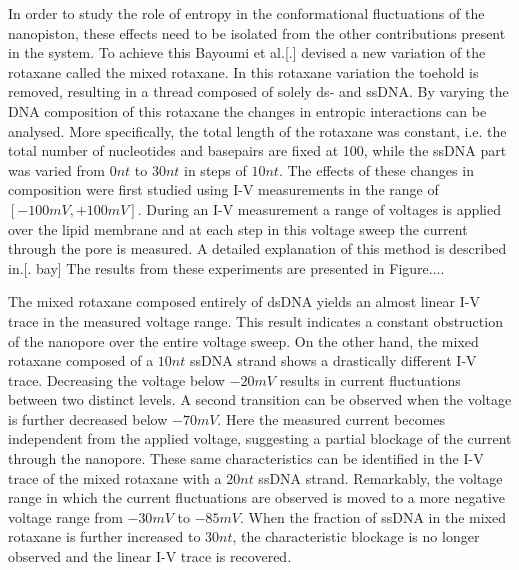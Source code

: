
In order to study the role of entropy in the conformational fluctuations of
the nanopiston, these effects need to be isolated from the other contributions present in
the system. To achieve this Bayoumi et al.[.] devised a new variation of the rotaxane
called the mixed rotaxane. In this rotaxane variation the toehold is removed, resulting
in a thread composed of solely ds- and ssDNA. By varying the DNA composition of this
rotaxane the changes in entropic interactions can be analysed. More specifically, the
total length of the rotaxane was constant, i.e. the total number of nucleotides and
basepairs are fixed at 100, while the ssDNA part was varied from $0nt$ to $30 nt$ in
steps of $10nt$. The effects of these changes in composition were first studied using I-V
measurements in the range of $[-100mV, +100mV]$. During an I-V measurement a range of
voltages is applied over the lipid membrane and at each step in this voltage sweep the
current through the pore is measured. A detailed explanation of this method is described
in.[. bay] The results from these experiments are presented in Figure....

The mixed rotaxane composed entirely of dsDNA yields an almost linear I-V trace in the
measured voltage range. This result indicates a constant obstruction of the nanopore over
the entire voltage sweep. On the other hand, the mixed rotaxane composed of a $10nt$
ssDNA strand shows a drastically different I-V trace. Decreasing the voltage below
$-20mV$ results in current fluctuations between two distinct levels. A second transition
can be observed when the voltage is further decreased below $-70mV$. Here the measured
current becomes independent from the applied voltage, suggesting a partial blockage of
the current through the nanopore. These same characteristics can be identified in the I-V
trace of
the mixed rotaxane with a $20nt$ ssDNA strand. Remarkably, the voltage range
in which the current fluctuations are observed is moved to a more negative
voltage range from $-30mV$ to  $-85 mV$. When the fraction of ssDNA in the mixed rotaxane
is further increased to $30nt$, the characteristic blockage is no longer observed and the
linear I-V trace is recovered.

